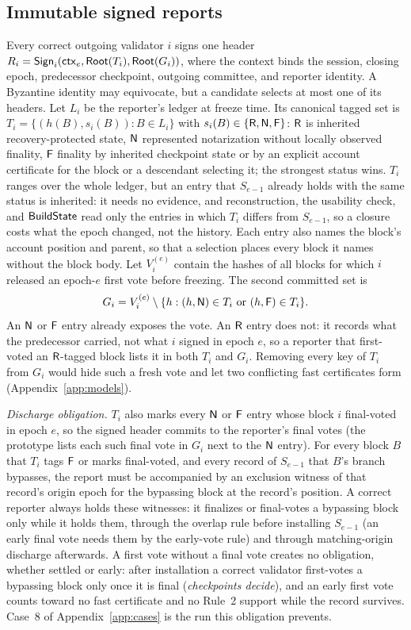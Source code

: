 \subsection{Immutable signed reports}
\label{sec:reports}
Every correct outgoing validator $i$ signs one header $R_i=\mathsf{Sign}_i(\mathsf{ctx}_e,\mathsf{Root}(T_i),\mathsf{Root}(G_i))$, where the context binds the session, closing epoch, predecessor checkpoint, outgoing committee, and reporter identity. A Byzantine identity may equivocate, but a candidate selects at most one of its headers. Let $L_i$ be the reporter's ledger at freeze time. Its canonical tagged set is $T_i=\{(h(B),s_i(B)):B\in L_i\}$ with $s_i(B)\in\{\mathsf{R},\mathsf{N},\mathsf{F}\}$: $\mathsf{R}$ is inherited recovery-protected state, $\mathsf{N}$ represented notarization without locally observed finality, $\mathsf{F}$ finality by inherited checkpoint state or by an explicit account certificate for the block or a descendant selecting it; the strongest status wins. $T_i$ ranges over the whole ledger, but an entry that $S_{e-1}$ already holds with the same status is inherited: it needs no evidence, and reconstruction, the usability check, and $\mathsf{BuildState}$ read only the entries in which $T_i$ differs from $S_{e-1}$, so a closure costs what the epoch changed, not the history. Each entry also names the block's account position and parent, so that a selection places every block it names without the block body. Let $V_i^{(e)}$ contain the hashes of all blocks for which $i$ released an epoch-$e$ first vote before freezing. The second committed set is
\[
G_i=V_i^{(e)}\setminus\{h:(h,\tagN)\in T_i\ \text{or}\ (h,\tagF)\in T_i\}.
\]
An $\mathsf{N}$ or $\mathsf{F}$ entry already exposes the vote. An $\mathsf{R}$ entry does not: it records what the predecessor carried, not what $i$ signed in epoch $e$, so a reporter that first-voted an $\mathsf{R}$-tagged block lists it in both $T_i$ and $G_i$. Removing every key of $T_i$ from $G_i$ would hide such a fresh vote and let two conflicting fast certificates form (Appendix~\ref{app:models}).

\emph{Discharge obligation.} $T_i$ also marks every $\mathsf{N}$ or $\mathsf{F}$ entry whose block $i$ final-voted in epoch $e$, so the signed header commits to the reporter's final votes (the prototype lists each such final vote in $G_i$ next to the $\mathsf{N}$ entry). For every block $B$ that $T_i$ tags $\mathsf{F}$ or marks final-voted, and every record of $S_{e-1}$ that $B$'s branch bypasses, the report must be accompanied by an exclusion witness of that record's origin epoch for the bypassing block at the record's position. A correct reporter always holds these witnesses: it finalizes or final-votes a bypassing block only while it holds them, through the overlap rule before installing $S_{e-1}$ (an early final vote needs them by the early-vote rule) and through matching-origin discharge afterwards. A first vote without a final vote creates no obligation, whether settled or early: after installation a correct validator first-votes a bypassing block only once it is final (\emph{checkpoints decide}), and an early first vote counts toward no fast certificate and no Rule~2 support while the record survives. Case~8 of Appendix~\ref{app:cases} is the run this obligation prevents.

